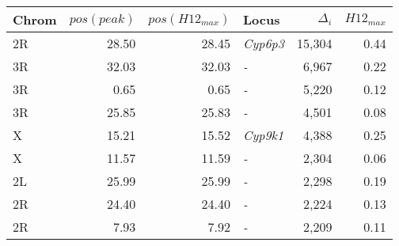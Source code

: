 \begin{tabular}{lrrlrr}
\toprule
Chrom & $pos(peak)$ & $pos(H12_{max})$ &            Locus & $\Delta_{i}$ & $H12_{max}$ \\
\midrule
   2R &       28.50 &            28.45 &  \textit{Cyp6p3} &       15,304 &        0.44 \\
   3R &       32.03 &            32.03 &       \textit{-} &        6,967 &        0.22 \\
   3R &        0.65 &             0.65 &       \textit{-} &        5,220 &        0.12 \\
   3R &       25.85 &            25.83 &       \textit{-} &        4,501 &        0.08 \\
    X &       15.21 &            15.52 &  \textit{Cyp9k1} &        4,388 &        0.25 \\
    X &       11.57 &            11.59 &       \textit{-} &        2,304 &        0.06 \\
   2L &       25.99 &            25.99 &       \textit{-} &        2,298 &        0.19 \\
   2R &       24.40 &            24.40 &       \textit{-} &        2,224 &        0.13 \\
   2R &        7.93 &             7.92 &       \textit{-} &        2,209 &        0.11 \\
\bottomrule
\end{tabular}

